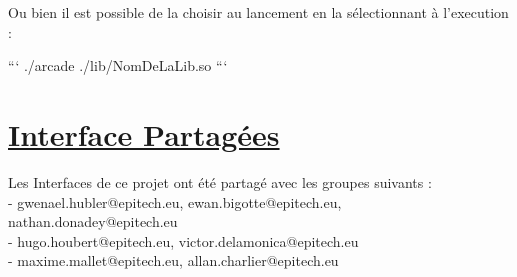 \documentclass{report}
\begin{document}
\hspace*{-0.5cm}Ou bien il est possible de la choisir au lancement en la sélectionnant à l'execution :

\begin{tcolorbox}[colback=black!75!white]
{\color{white}
\begin{markdown}
```
./arcade ./lib/NomDeLaLib.so
```
\end{markdown}
}
\end{tcolorbox}

\section{\underline{Interface Partagées}}

Les Interfaces de ce projet ont été partagé avec les groupes suivants : \\
\hspace*{1cm}- gwenael.hubler@epitech.eu, ewan.bigotte@epitech.eu, nathan.donadey@epitech.eu \\
\hspace*{1cm}- hugo.houbert@epitech.eu, victor.delamonica@epitech.eu \\
\hspace*{1cm}- maxime.mallet@epitech.eu, allan.charlier@epitech.eu \\
\end{document}

